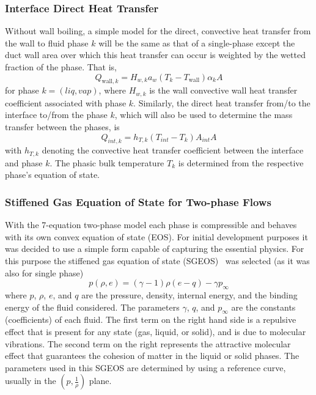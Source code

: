 \subsubsection{Interface Direct Heat Transfer}
Without wall boiling, a simple model for the direct, convective heat transfer
from the wall to fluid phase $k$ will be the same as that of a single-phase
except the duct wall area over which this heat transfer can occur is weighted
by the wetted fraction of the phase.  That is,
\begin{equation}
  Q_{ \text{wall}, k } = H_{w,k} a_w \left(T_k  - T_{ \text{wall} } \right) \alpha_k A
\end{equation}
for phase $k=(liq, vap)$, where $H_{w,k}$ is the wall convective wall heat transfer
coefficient associated with phase $k$.  Similarly, the direct heat
transfer from/to the interface to/from the phase $k$, which will also
be used to determine the mass transfer between the phases, is
\begin{equation}
  Q_{int,  k} = h_{T,  k}  \left( T_{int} - T_k \right)  A_{int}  A
\end{equation}
with $h_{T,  k}$ denoting the convective heat transfer coefficient
between the interface and phase $k$. The phasic bulk
temperature $T_k$ is determined from the respective phase's equation of
state.
\subsubsection{Stiffened Gas Equation of State for Two-phase Flows} \label{sec:SGEOS}
With the 7-equation two-phase model each phase is compressible and
behaves with its own convex equation of state (EOS).  For initial
development purposes it was decided to use a simple form capable of
capturing the essential physics.  For this purpose the stiffened
gas equation of state (SGEOS)~\cite{SGEOS} was selected (as
it was also for single phase)
\begin{equation}
  \label{E-R:96}
  p(\rho,e) = (\gamma -1) \rho (e - q) - \gamma p_{\infty}
\end{equation}
where $p$, $\rho$, $e$, and $q$ are the pressure, density,
internal energy, and the binding energy of the fluid considered.  The
parameters $\gamma$, $q$, and $p_{\infty}$ are the constants
(coefficients) of each fluid.  The first term on the right hand side
is a repulsive effect that is present for any state (gas, liquid, or
solid), and is due to molecular vibrations.  The second term on the
right represents the attractive molecular effect that guarantees the
cohesion of matter in the liquid or solid phases.  The parameters used
in this SGEOS are determined by using a reference curve, usually in
the $\left(p, \frac{1}{\rho}\right)$ plane.

